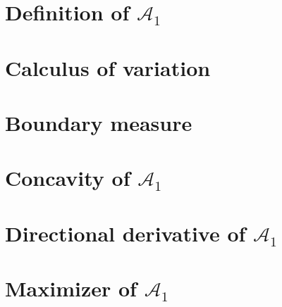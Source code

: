 
\section{Definition of $\mathcal{A}_1$}
\label{sec:definition-of-a1}


\section{Calculus of variation}
\label{sec:calculus-of-variation}


\section{Boundary measure}
\label{sec:boundary-measure}


\section{Concavity of $\mathcal{A}_1$}
\label{sec:concavity-of-a1}


\section{Directional derivative of $\mathcal{A}_1$}
\label{sec:directional-derivative-of-a1}


\section{Maximizer of $\mathcal{A}_1$}
\label{sec:maximizer-of-a1}


